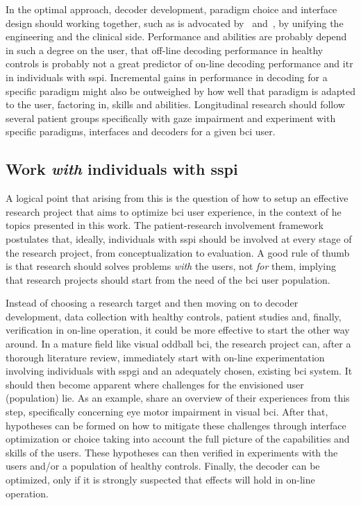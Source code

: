 In the optimal approach, decoder development, paradigm choice and interface
design should working together, such as is advocated
by~\textcite{Pan2022} and~\textcite{Fouad2020}, by unifying the engineering and
the clinical side.
Performance and abilities are probably depend in such a degree on the user,
that off-line decoding performance in healthy controls is probably not a great
predictor of on-line decoding performance and \ac{itr} in individuals with
\ac{sspi}.
Incremental gains in performance in decoding for a specific paradigm might
also be outweighed by how well that paradigm is adapted to the user, factoring in,
skills and abilities.
Longitudinal research should follow several patient groups specifically with gaze
impairment and experiment with specific paradigms, interfaces and decoders for
a given \ac{bci} user.

\subsection{Work \emph{with} individuals with \acs{sspi}}

A logical point that arising from this is the question of how to setup an
effective research project that aims to optimize \ac{bci} user experience, in
the context of he topics presented in this work.
The patient-research involvement framework postulates that, ideally, individuals with
\ac{sspi} should be involved at every stage of the research project, from conceptualization
to evaluation.
A good rule of thumb is that research should solves problems \emph{with} the
users, not \emph{for} them, implying that research projects should start from
the need of the \ac{bci} user population.

Instead of choosing a research target and then moving on to decoder
development, data collection with healthy controls, patient studies and,
finally, verification in on-line operation, it could be more effective to start
the other way around.
In a mature field like visual oddball \ac{bci}, the research project can, after
a thorough literature review, immediately start with on-line experimentation
involving individuals with \ac{sspgi} and an adequately chosen, existing \ac{bci} system.
It should then become apparent where challenges for the envisioned user
(population) lie.
As an example, \textcite{FriedOken2020} share an overview of their experiences from this step,
specifically concerning eye motor impairment in visual \ac{bci}.
After that, hypotheses can be formed on how to mitigate these challenges
through interface optimization or choice taking into account the full picture
of the capabilities and skills of the users.
These hypotheses can then verified in experiments
with the users and/or a population of healthy controls.
Finally, the decoder can be optimized, only if it is strongly suspected that
effects will hold in on-line operation.

